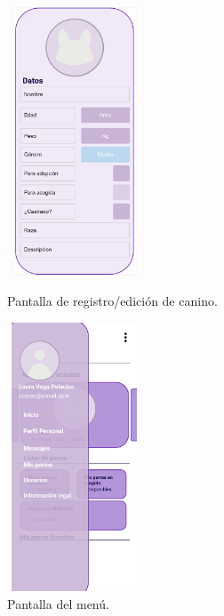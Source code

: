 \documentclass[a4paper, 12pt]{article}
\begin{document}
\begin{figure}[H]
   	\begin{minipage}{0.48\textwidth}
		\begin{center}
			{\includegraphics[height=8cm, width=4cm]{design/RegisterDog.jpg}\par}
			\caption{Pantalla de registro/edición de canino.}
			\medskip
		\end{center}  
	\end{minipage}\hfill
   	\begin{minipage}{0.48\textwidth}
		\begin{center}
			{\includegraphics[height=8cm, width=4cm]{design/SideMenu.jpg}\par}
			\caption{Pantalla del menú.}
			\medskip
		\end{center}  
	\end{minipage}\hfill
\end{figure}
\end{document}
